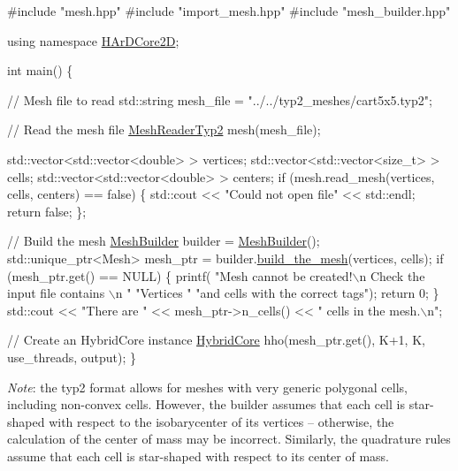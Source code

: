 \begin{DoxyCode}
\textcolor{preprocessor}{#include "mesh.hpp"}
\textcolor{preprocessor}{#include "import\_mesh.hpp"}
\textcolor{preprocessor}{#include "mesh\_builder.hpp"}

\textcolor{keyword}{using namespace }\hyperlink{namespaceHArDCore2D}{HArDCore2D};

\textcolor{keywordtype}{int} main() \{

    \textcolor{comment}{// Mesh file to read}
    std::string mesh\_file = \textcolor{stringliteral}{"../../typ2\_meshes/cart5x5.typ2"};

  \textcolor{comment}{// Read the mesh file}
  \hyperlink{classHArDCore2D_1_1MeshReaderTyp2}{MeshReaderTyp2} mesh(mesh\_file);

  std::vector<std::vector<double> > vertices;
  std::vector<std::vector<size\_t> > cells;
  std::vector<std::vector<double> > centers;
  \textcolor{keywordflow}{if} (mesh.read\_mesh(vertices, cells, centers) == \textcolor{keyword}{false}) \{
    std::cout << \textcolor{stringliteral}{"Could not open file"} << std::endl;
    \textcolor{keywordflow}{return} \textcolor{keyword}{false};
  \};

  \textcolor{comment}{// Build the mesh}
  \hyperlink{classHArDCore2D_1_1MeshBuilder}{MeshBuilder} builder = \hyperlink{classHArDCore2D_1_1MeshBuilder}{MeshBuilder}();
  std::unique\_ptr<Mesh> mesh\_ptr = builder.\hyperlink{classHArDCore2D_1_1MeshBuilder_a0ef4a78ac64d1bcb6380317ea866758d}{build\_the\_mesh}(vertices, cells);
  \textcolor{keywordflow}{if} (mesh\_ptr.get() == NULL) \{
    printf(
      \textcolor{stringliteral}{"Mesh cannot be created!\(\backslash\)n Check the input file contains \(\backslash\)n "}
      \textcolor{stringliteral}{"Vertices "}
      \textcolor{stringliteral}{"and cells with the correct tags"});
    \textcolor{keywordflow}{return} 0;
  \} 
    std::cout << \textcolor{stringliteral}{"There are "} << mesh\_ptr->n\_cells() << \textcolor{stringliteral}{" cells in the mesh.\(\backslash\)n"};

    \textcolor{comment}{// Create an HybridCore instance}
  \hyperlink{classHArDCore2D_1_1HybridCore}{HybridCore} hho(mesh\_ptr.get(), K+1, K, use\_threads, output);
\}
\end{DoxyCode}


{\itshape Note}\+: the {\ttfamily typ2} format allows for meshes with very generic polygonal cells, including non-\/convex cells. However, the builder assumes that each cell is star-\/shaped with respect to the isobarycenter of its vertices -- otherwise, the calculation of the center of mass may be incorrect. Similarly, the quadrature rules assume that each cell is star-\/shaped with respect to its center of mass.

